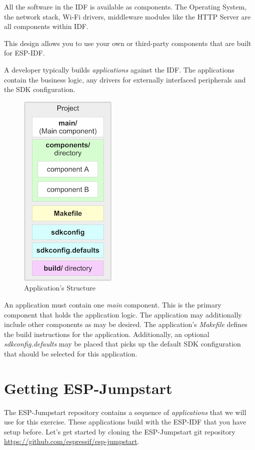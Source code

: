 \documentclass[main.tex]{subfiles}
\begin{document}
All the software in the IDF is available as components. The Operating System, the network stack, Wi-Fi drivers, middleware modules like the HTTP Server are all components within IDF. 

This design allows you to use your own or third-party components that are built for ESP-IDF.

A developer typically builds \textit{applications} against the IDF. The applications contain the business logic, any drivers for externally interfaced peripherals and the SDK configuration.

\begin{figure}[h!]
    \centering
    \includegraphics[scale=0.6]{../../_static/app_structure.png}
    \caption{Application's Structure}
    \label{fig:app_structure}
\end{figure}

An application must contain one \textit{main} component. This is the primary component that holds the application logic. The application may additionally include other components as may be desired.
The application's \textit{Makefile} defines the build instructions for the application. 
Additionally, an optional \textit{sdkconfig.defaults} may be placed that picks up the default SDK configuration that should be selected for this application.


\section{Getting ESP-Jumpstart}

The ESP-Jumpstart repository contains a sequence of \textit{applications} that we will use for this exercise. These applications build with the ESP-IDF that you have setup before. Let's get started by cloning the ESP-Jumpstart git repository \url{https://github.com/espressif/esp-jumpstart}. 
\end{document}
